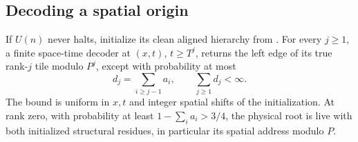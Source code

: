 \subsection{Decoding a spatial origin}
\begin{lemma}\label{lem:line-decoder}
If $U(n)$ never halts, initialize its clean aligned hierarchy from
\cite[Lemma~6.4]{DMline}. For every $j\ge1$, a finite space-time decoder
at $(x,t)$, $t\ge T^j$, returns the left edge of its true rank-$j$ tile
modulo $P^j$, except with probability at most
\[
 d_j=\sum_{i\ge j-1}a_i,\qquad \sum_{j\ge1}d_j<\infty.
\]
The bound is uniform in $x,t$ and integer spatial shifts of the
initialization. At rank zero, with probability at least
$1-\sum_i a_i>3/4$, the physical root is live with both initialized
structural residues, in particular its spatial address modulo $P$.
\end{lemma}
